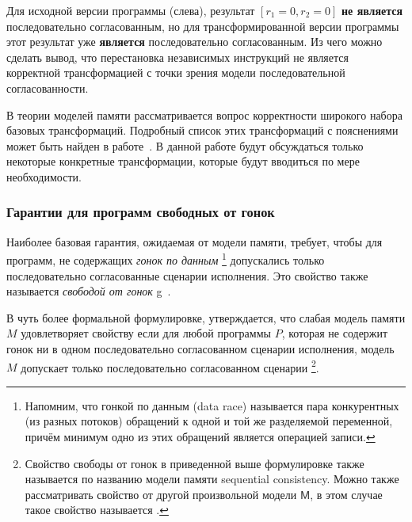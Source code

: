 \bigskip

Для исходной версии программы (слева), 
результат $[r_1=0, r_2=0]$ \textbf{не является} 
последовательно согласованным, но для трансформированной 
версии программы этот результат уже \textbf{является} 
последовательно согласованным. 
Из чего можно сделать вывод, что перестановка независимых инструкций 
не является корректной трансформацией с точки зрения 
модели последовательной согласованности. 

В теории моделей памяти рассматривается вопрос корректности 
широкого набора базовых трансформаций.
Подробный список этих трансформаций с пояснениями 
может быть найден в работе~\cite{Moiseenko-al:PCS21}.
В данной работе будут обсуждаться только некоторые 
конкретные трансформации, которые будут вводиться по мере необходимости. 


\subsubsection*{Гарантии для программ свободных от гонок}

Наиболее базовая гарантия, ожидаемая от модели памяти, 
требует, чтобы для программ, не содержащих \emph{гонок по данным}%
\footnote{Напомним, что гонкой по данным (data race) называется пара конкурентных (из разных потоков)
обращений к одной и той же разделяемой переменной,
причём минимум одно из этих обращений является операцией записи.} 
допускались только последовательно согласованные сценарии исполнения. 
Это свойство также называется \emph{свободой от гонок}
g~\cite{Manson-al:POPL05}.

В чуть более формальной формулировке, утверждается, 
что слабая модель памяти $M$ удовлетворяет свойству \DRF
если для любой программы $P$, которая не содержит 
гонок ни в одном последовательно согласованном сценарии исполнения,
модель $M$ допускает только последовательно согласованном сценарии%
\footnote{Свойство свободы от гонок в приведенной выше формулировке
также называется  по названию модели памяти 
sequential consistency. 
Можно также рассматривать свойство \DRF от другой 
произвольной модели $\mathsf{M}$, в этом случае такое 
свойство называется .}.

